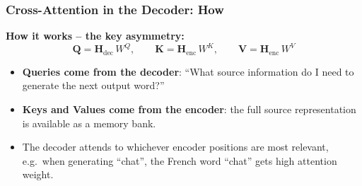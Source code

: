 \begin{frame}[fragile]\frametitle{Cross-Attention in the Decoder: How}
\textbf{How it works – the key asymmetry:}
\[
  \mathbf{Q} = \mathbf{H}_{\text{dec}}\,W^Q, \qquad
  \mathbf{K} = \mathbf{H}_{\text{enc}}\,W^K, \qquad
  \mathbf{V} = \mathbf{H}_{\text{enc}}\,W^V
\]
\begin{itemize}
\item \textbf{Queries come from the decoder}: ``What source information do I need
      to generate the next output word?''
\item \textbf{Keys and Values come from the encoder}: the full source
      representation is available as a memory bank.
\item The decoder attends to whichever encoder positions are most relevant, 
      e.g.\ when generating ``chat'', the French word ``chat'' gets high attention weight.
\end{itemize}
\end{frame}


